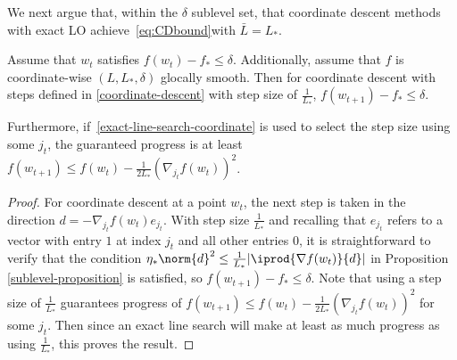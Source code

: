 \documentclass[10pt]{article} %
\begin{document}
We next argue that, within the $\delta$ sublevel set, that coordinate descent methods with exact LO achieve~\eqref{eq:CDbound}with $\bar{L}=L_*$.
\begin{corollary}
    \label{sublevel-CD-corollary}
    Assume that $w_{t}$ satisfies $f(w_{t}) - f_{*} \leq \delta$. Additionally, assume that $f$ is coordinate-wise $(L, L_{*}, \delta)$ glocally smooth. Then for coordinate descent with steps defined in \eqref{coordinate-descent} with step size of $\frac{1}{L_{*}}$, $f(w_{t+1}) - f_{*} \leq \delta$. 
    
    Furthermore, if~\eqref{exact-line-search-coordinate} is used to select the step size using some $j_t$, the guaranteed progress is at least $f(w_{t+1}) \leq f(w_{t}) - \frac{1}{2L_{*}}(\nabla_{j_{t}} f(w_{t}))^2$. 
\end{corollary}
\begin{proof}
    For coordinate descent at a point $w_{t}$, the next step is taken in the direction $d = -\nabla_{j_{t}} f(w_{t})e_{j_{t}}$. With step size $\frac{1}{L_{*}}$ and recalling that $e_{j_{t}}$ refers to a vector with entry $1$ at index $j_{t}$ and all other entries $0$, it is straightforward to verify that the condition $\eta_{*} \norm{d}^2 \leq \frac{1}{L_{*}} |\iprod{\nabla f(w_{t})}{d}|$ in Proposition \ref{sublevel-proposition} 
    is satisfied, so $f(w_{t+1}) - f_{*} \leq \delta$. Note that using a step size of $\frac{1}{L_{*}}$ guarantees progress of $f(w_{t+1}) \leq f(w_{t}) - \frac{1}{2L_{*}}(\nabla_{j_{t}} f(w_{t}))^2$ for some $j_{t}$. Then since an exact line search will make at least as much progress as using $\frac{1}{L_{*}}$, this proves the result.
\end{proof}
\end{document}
